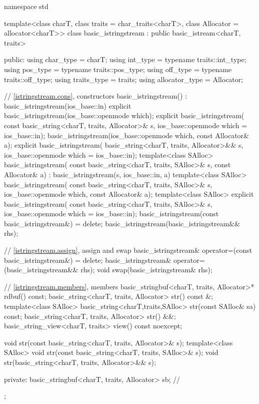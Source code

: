 %
\begin{codeblock}
namespace std {
  template<class charT, class traits = char_traits<charT>,
           class Allocator = allocator<charT>>
  class basic_istringstream : public basic_istream<charT, traits> {
  public:
    using char_type      = charT;
    using int_type       = typename traits::int_type;
    using pos_type       = typename traits::pos_type;
    using off_type       = typename traits::off_type;
    using traits_type    = traits;
    using allocator_type = Allocator;

    // \ref{istringstream.cons}, constructors
    basic_istringstream() : basic_istringstream(ios_base::in) {}
    explicit basic_istringstream(ios_base::openmode which);
    explicit basic_istringstream(
      const basic_string<charT, traits, Allocator>& s,
      ios_base::openmode which = ios_base::in);
    basic_istringstream(ios_base::openmode which, const Allocator& a);
    explicit basic_istringstream(
      basic_string<charT, traits, Allocator>&& s,
      ios_base::openmode which = ios_base::in);
    template<class SAlloc>
      basic_istringstream(
        const basic_string<charT, traits, SAlloc>& s, const Allocator& a)
        : basic_istringstream(s, ios_base::in, a) {}
    template<class SAlloc>
      basic_istringstream(
        const basic_string<charT, traits, SAlloc>& s,
        ios_base::openmode which, const Allocator& a);
    template<class SAlloc>
      explicit basic_istringstream(
        const basic_string<charT, traits, SAlloc>& s,
        ios_base::openmode which = ios_base::in);
    basic_istringstream(const basic_istringstream&) = delete;
    basic_istringstream(basic_istringstream&& rhs);

    // \ref{istringstream.assign}, assign and swap
    basic_istringstream& operator=(const basic_istringstream&) = delete;
    basic_istringstream& operator=(basic_istringstream&& rhs);
    void swap(basic_istringstream& rhs);

    // \ref{istringstream.members}, members
    basic_stringbuf<charT, traits, Allocator>* rdbuf() const;
    basic_string<charT, traits, Allocator> str() const &;
    template<class SAlloc>
      basic_string<charT,traits,SAlloc> str(const SAlloc& sa) const;
    basic_string<charT, traits, Allocator> str() &&;
    basic_string_view<charT, traits> view() const noexcept;

    void str(const basic_string<charT, traits, Allocator>& s);
    template<class SAlloc>
      void str(const basic_string<charT, traits, SAlloc>& s);
    void str(basic_string<charT, traits, Allocator>&& s);

  private:
    basic_stringbuf<charT, traits, Allocator> sb;   // \expos
  };
}
\end{codeblock}

